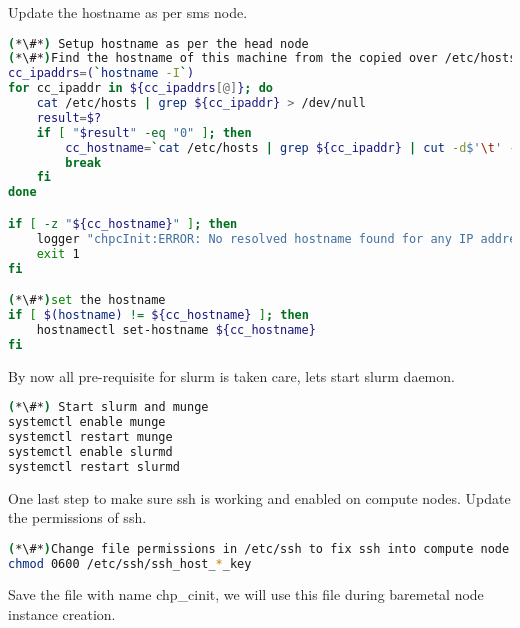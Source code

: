 Update the hostname as per sms node.

\begin{lstlisting}[language=bash,keywords={}]
(*\#*) Setup hostname as per the head node
(*\#*)Find the hostname of this machine from the copied over /etc/hosts file
cc_ipaddrs=(`hostname -I`)
for cc_ipaddr in ${cc_ipaddrs[@]}; do
    cat /etc/hosts | grep ${cc_ipaddr} > /dev/null
    result=$?
    if [ "$result" -eq "0" ]; then
        cc_hostname=`cat /etc/hosts | grep ${cc_ipaddr} | cut -d$'\t' -f2`
        break
    fi
done

if [ -z "${cc_hostname}" ]; then
    logger "chpcInit:ERROR: No resolved hostname found for any IP address in /etc/hosts"
    exit 1
fi

(*\#*)set the hostname
if [ $(hostname) != ${cc_hostname} ]; then
    hostnamectl set-hostname ${cc_hostname}
fi
\end{lstlisting}


By now all pre-requisite for slurm is taken care, lets start slurm daemon.

\begin{lstlisting}[language=bash,keywords={}]
(*\#*) Start slurm and munge 
systemctl enable munge
systemctl restart munge
systemctl enable slurmd
systemctl restart slurmd
\end{lstlisting}

One last step to make sure ssh is working and enabled on compute nodes. Update the permissions 
of ssh.


\begin{lstlisting}[language=bash,keywords={}]
(*\#*)Change file permissions in /etc/ssh to fix ssh into compute node
chmod 0600 /etc/ssh/ssh_host_*_key
\end{lstlisting}

Save the file with name chp\_cinit, we will use this file during baremetal node instance creation.

